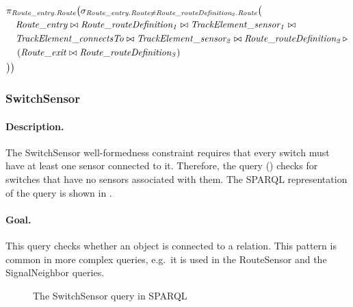 \begin{align*}
& \pi_{\mathit{Route\_entry.Route}} \big( \sigma_{\mathit{Route\_entry.Route} \neq \mathit{Route\_routeDefinition_2.Route}} \big( \\
& \quad \mathit{Route\_entry} \bowtie \mathit{Route\_routeDefinition_1} \bowtie \mathit{TrackElement\_sensor_1} \bowtie \\
& \quad \mathit{TrackElement\_connectsTo} \bowtie \mathit{TrackElement\_sensor_2} \bowtie \mathit{Route\_routeDefinition_2} \, \triangleright \, \\
& \quad \left( \mathit{Route\_exit} \bowtie \mathit{Route\_routeDefinition_3} \right) \\
& \big) \big)
\end{align*}

\subsubsection{SwitchSensor}

\paragraph{Description.} The \textsf{SwitchSensor} well-formedness constraint requires that every switch must have at least one sensor connected to it. Therefore, the query () checks for switches that have no sensors associated with them. The SPARQL representation of the query is shown in .

\paragraph{Goal.} This query checks whether an object is connected to a relation. This pattern is common in more complex queries, e.g.\ it is used in the \textsf{RouteSensor} and the \textsf{SignalNeighbor} queries.

\begin{figure}[Htb]
\centering
\begin{minipage}{0.6\textwidth}
  { \alignListing
    }
  \caption{The \textsf{SwitchSensor} query in SPARQL}
  \label{lst:switchsensor-sparql}
\end{minipage}
\end{figure}

% 
% 


